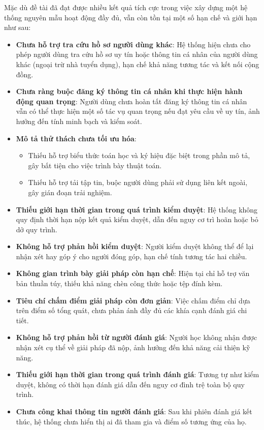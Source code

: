 Mặc dù đề tài đã đạt được nhiều kết quả tích cực trong việc xây dựng một hệ thống nguyên mẫu hoạt động đầy đủ, vẫn còn tồn tại một số hạn chế và giới hạn như sau:
\begin{itemize}
  \item \textbf{Chưa hỗ trợ tra cứu hồ sơ người dùng khác}: Hệ thống hiện chưa cho phép người dùng tra cứu hồ sơ uy tín hoặc thông tin cá nhân của người dùng khác (ngoại trừ nhà tuyển dụng), hạn chế khả năng tương tác và kết nối cộng đồng.
  \item \textbf{Chưa ràng buộc đăng ký thông tin cá nhân khi thực hiện hành động quan trọng}: Người dùng chưa hoàn tất đăng ký thông tin cá nhân vẫn có thể thực hiện một số tác vụ quan trọng nếu đạt yêu cầu về uy tín, ảnh hưởng đến tính minh bạch và kiểm soát.
  \item \textbf{Mô tả thử thách chưa tối ưu hóa}:
        \begin{itemize}
          \item Thiếu hỗ trợ biểu thức toán học và ký hiệu đặc biệt trong phần mô tả, gây bất tiện cho việc trình bày thuật toán.
          \item Thiếu hỗ trợ tải tập tin, buộc người dùng phải sử dụng liên kết ngoài, gây gián đoạn trải nghiệm.
        \end{itemize}
  \item \textbf{Thiếu giới hạn thời gian trong quá trình kiểm duyệt}: Hệ thống không quy định thời hạn nộp kết quả kiểm duyệt, dẫn đến nguy cơ trì hoãn hoặc bỏ dở quy trình.
  \item \textbf{Không hỗ trợ phản hồi kiểm duyệt}: Người kiểm duyệt không thể để lại nhận xét hay góp ý cho người đóng góp, hạn chế tính tương tác hai chiều.
  \item \textbf{Không gian trình bày giải pháp còn hạn chế}: Hiện tại chỉ hỗ trợ văn bản thuần túy, thiếu khả năng chèn công thức hoặc tệp đính kèm.
  \item \textbf{Tiêu chí chấm điểm giải pháp còn đơn giản}: Việc chấm điểm chỉ dựa trên điểm số tổng quát, chưa phản ánh đầy đủ các khía cạnh đánh giá chi tiết.
  \item \textbf{Không hỗ trợ phản hồi từ người đánh giá}: Người học không nhận được nhận xét cụ thể về giải pháp đã nộp, ảnh hưởng đến khả năng cải thiện kỹ năng.
  \item \textbf{Thiếu giới hạn thời gian trong quá trình đánh giá}: Tương tự như kiểm duyệt, không có thời hạn đánh giá dẫn đến nguy cơ đình trệ toàn bộ quy trình.
  \item \textbf{Chưa công khai thông tin người đánh giá}: Sau khi phiên đánh giá kết thúc, hệ thống chưa hiển thị ai đã tham gia và điểm số tương ứng của họ.

\end{itemize}
